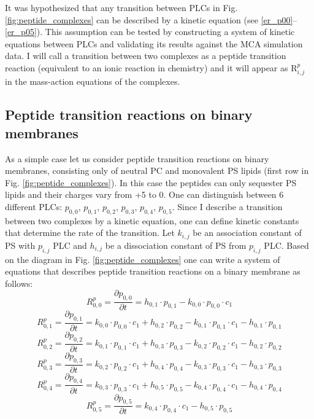 It was hypothesized that any transition between PLCs in Fig. \ref{fig:peptide_complexes} can be described by a kinetic equation (see \eqref{er_p00}--\eqref{er_p05}). This assumption can be tested by constructing a system of kinetic equations between PLCs and validating its results against the MCA simulation data. I will call a transition between two complexes as a peptide transition reaction (equivalent to an ionic reaction in chemistry) and it will appear as R$_{i,j}^p$ in the mass-action equations of the complexes.

\subsection{Peptide transition reactions on binary membranes}

As a simple case let us consider peptide transition reactions on binary membranes, consisting only of neutral PC and monovalent PS lipids (first row in Fig. \ref{fig:peptide_complexes}). In this case the peptides can only sequester PS lipids and their charges vary from +5 to 0. One can distinguish between 6 different PLCs: $p_{0,0}$, $p_{0,1}$, $p_{0,2}$, $p_{0,3}$, $p_{0,4}$, $p_{0,5}$. Since I describe a transition between two complexes by a kinetic equation, one can define kinetic constants that determine the rate of the transition. Let $k_{i,j}$ be an association constant of PS with $p_{i,j}$ PLC and $h_{i,j}$ be a dissociation constant of PS from $p_{i,j}$ PLC. Based on the diagram in Fig. \ref{fig:peptide_complexes} one can write a system of equations that describes peptide transition reactions on a binary membrane as follows:
\begin{equation}
 \label {er_p00}
 R_{0,0}^p=\frac{\partial p_{0,0}}{\partial t}=h_{0,1} \cdot p_{0,1} - k_{0,0}\cdot p_{0,0} \cdot c_1
\end{equation}
\begin{equation}
 \label {er_p01}
 R_{0,1}^p=\frac{\partial p_{0,1}}{\partial t}=k_{0,0} \cdot p_{0,0} \cdot c_1 + h_{0,2} \cdot p_{0,2} - k_{0,1} \cdot p_{0,1} \cdot c_1 - h_{0,1} \cdot p_{0,1}
\end{equation}
\begin{equation}
 \label {er_p02}
 R_{0,2}^p=\frac{\partial p_{0,2}}{\partial t}=k_{0,1} \cdot p_{0,1} \cdot c_1 + h_{0,3} \cdot p_{0,3} - k_{0,2} \cdot p_{0,2} \cdot c_1 - h_{0,2} \cdot p_{0,2}
\end{equation}
\begin{equation}
 \label {er_p03}
 R_{0,3}^p=\frac{\partial p_{0,3}}{\partial t}=k_{0,2} \cdot p_{0,2} \cdot c_1 + h_{0,4} \cdot p_{0,4} - k_{0,3} \cdot p_{0,3} \cdot c_1 - h_{0,3} \cdot p_{0,3}
\end{equation}
\begin{equation}
 \label {er_p04}
 R_{0,4}^p=\frac{\partial p_{0,4}}{\partial t}=k_{0,3} \cdot p_{0,3} \cdot c_1 + h_{0,5} \cdot p_{0,5} - k_{0,4} \cdot p_{0,4} \cdot c_1 - h_{0,4} \cdot p_{0,4}
\end{equation}
\begin{equation}
 \label {er_p05}
 R_{0,5}^p=\frac{\partial p_{0,5}}{\partial t}=k_{0,4} \cdot p_{0,4} \cdot c_1 - h_{0,5} \cdot p_{0,5}
\end{equation}

